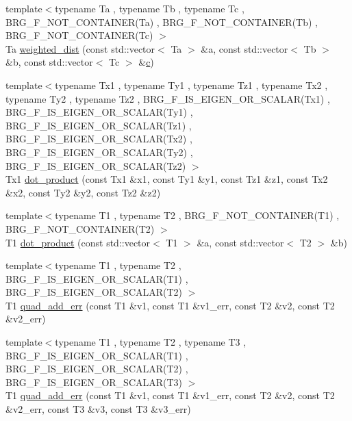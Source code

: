 \begin{DoxyCompactItemize}
\item 
{\footnotesize template$<$typename Ta , typename Tb , typename Tc , B\-R\-G\-\_\-\-F\-\_\-\-N\-O\-T\-\_\-\-C\-O\-N\-T\-A\-I\-N\-E\-R(\-Ta) , B\-R\-G\-\_\-\-F\-\_\-\-N\-O\-T\-\_\-\-C\-O\-N\-T\-A\-I\-N\-E\-R(\-Tb) , B\-R\-G\-\_\-\-F\-\_\-\-N\-O\-T\-\_\-\-C\-O\-N\-T\-A\-I\-N\-E\-R(\-Tc) $>$ }\\Ta \hyperlink{namespaceIceBRG_a6fc01772c041b44d2db3e85d6f350459}{weighted\-\_\-dist} (const std\-::vector$<$ Ta $>$ \&a, const std\-::vector$<$ Tb $>$ \&b, const std\-::vector$<$ Tc $>$ \&\hyperlink{namespaceIceBRG_a064ef8d17408ee9f2c81f8aa1f87155e}{c})
\item 
{\footnotesize template$<$typename Tx1 , typename Ty1 , typename Tz1 , typename Tx2 , typename Ty2 , typename Tz2 , B\-R\-G\-\_\-\-F\-\_\-\-I\-S\-\_\-\-E\-I\-G\-E\-N\-\_\-\-O\-R\-\_\-\-S\-C\-A\-L\-A\-R(\-Tx1) , B\-R\-G\-\_\-\-F\-\_\-\-I\-S\-\_\-\-E\-I\-G\-E\-N\-\_\-\-O\-R\-\_\-\-S\-C\-A\-L\-A\-R(\-Ty1) , B\-R\-G\-\_\-\-F\-\_\-\-I\-S\-\_\-\-E\-I\-G\-E\-N\-\_\-\-O\-R\-\_\-\-S\-C\-A\-L\-A\-R(\-Tz1) , B\-R\-G\-\_\-\-F\-\_\-\-I\-S\-\_\-\-E\-I\-G\-E\-N\-\_\-\-O\-R\-\_\-\-S\-C\-A\-L\-A\-R(\-Tx2) , B\-R\-G\-\_\-\-F\-\_\-\-I\-S\-\_\-\-E\-I\-G\-E\-N\-\_\-\-O\-R\-\_\-\-S\-C\-A\-L\-A\-R(\-Ty2) , B\-R\-G\-\_\-\-F\-\_\-\-I\-S\-\_\-\-E\-I\-G\-E\-N\-\_\-\-O\-R\-\_\-\-S\-C\-A\-L\-A\-R(\-Tz2) $>$ }\\Tx1 \hyperlink{namespaceIceBRG_a7be15030ad49d6a978105c2b85d66f54}{dot\-\_\-product} (const Tx1 \&x1, const Ty1 \&y1, const Tz1 \&z1, const Tx2 \&x2, const Ty2 \&y2, const Tz2 \&z2)
\item 
{\footnotesize template$<$typename T1 , typename T2 , B\-R\-G\-\_\-\-F\-\_\-\-N\-O\-T\-\_\-\-C\-O\-N\-T\-A\-I\-N\-E\-R(\-T1) , B\-R\-G\-\_\-\-F\-\_\-\-N\-O\-T\-\_\-\-C\-O\-N\-T\-A\-I\-N\-E\-R(\-T2) $>$ }\\T1 \hyperlink{namespaceIceBRG_a263a2159bf418d0f5f84bed960ab3c81}{dot\-\_\-product} (const std\-::vector$<$ T1 $>$ \&a, const std\-::vector$<$ T2 $>$ \&b)
\item 
{\footnotesize template$<$typename T1 , typename T2 , B\-R\-G\-\_\-\-F\-\_\-\-I\-S\-\_\-\-E\-I\-G\-E\-N\-\_\-\-O\-R\-\_\-\-S\-C\-A\-L\-A\-R(\-T1) , B\-R\-G\-\_\-\-F\-\_\-\-I\-S\-\_\-\-E\-I\-G\-E\-N\-\_\-\-O\-R\-\_\-\-S\-C\-A\-L\-A\-R(\-T2) $>$ }\\T1 \hyperlink{namespaceIceBRG_a8146f3c5303dff416be460ce5262c9d7}{quad\-\_\-add\-\_\-err} (const T1 \&v1, const T1 \&v1\-\_\-err, const T2 \&v2, const T2 \&v2\-\_\-err)
\item 
{\footnotesize template$<$typename T1 , typename T2 , typename T3 , B\-R\-G\-\_\-\-F\-\_\-\-I\-S\-\_\-\-E\-I\-G\-E\-N\-\_\-\-O\-R\-\_\-\-S\-C\-A\-L\-A\-R(\-T1) , B\-R\-G\-\_\-\-F\-\_\-\-I\-S\-\_\-\-E\-I\-G\-E\-N\-\_\-\-O\-R\-\_\-\-S\-C\-A\-L\-A\-R(\-T2) , B\-R\-G\-\_\-\-F\-\_\-\-I\-S\-\_\-\-E\-I\-G\-E\-N\-\_\-\-O\-R\-\_\-\-S\-C\-A\-L\-A\-R(\-T3) $>$ }\\T1 \hyperlink{namespaceIceBRG_a921419d07502c291853529dab2eb9dd3}{quad\-\_\-add\-\_\-err} (const T1 \&v1, const T1 \&v1\-\_\-err, const T2 \&v2, const T2 \&v2\-\_\-err, const T3 \&v3, const T3 \&v3\-\_\-err)

\end{DoxyCompactItemize}
